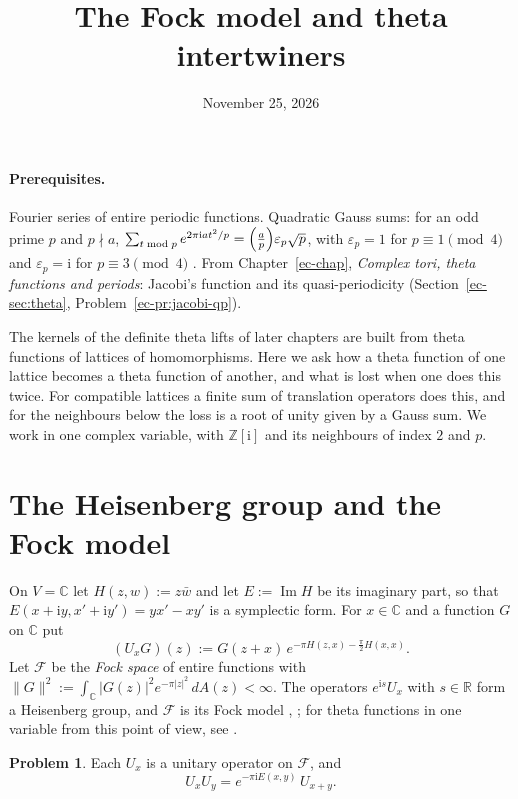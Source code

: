 \documentclass[reqno]{amsart}
\title{The Fock model and theta intertwiners}
\author{}
\date{November 25, 2026}
\newcounter{chap}
\theoremstyle{definition}
\newtheorem{problem}{Problem}[section]
\theoremstyle{plain}
\newcommand{\Z}{\mathbb{Z}}
\newcommand{\R}{\mathbb{R}}
\newcommand{\C}{\mathbb{C}}
\newcommand{\ii}{\mathrm{i}}
\newcommand{\Fc}{\mathcal{F}}
\newcommand{\leg}[2]{\Bigl(\frac{#1}{#2}\Bigr)}
\begin{document}
\maketitle
{}\label{chap}

\paragraph{Prerequisites.}
Fourier series of entire periodic functions.  Quadratic Gauss sums: for an odd prime \(p\) and \(p \nmid a\), \(\sum_{t \bmod p} e^{2\pi\ii a t^2/p} = \leg{a}{p}\varepsilon_p\sqrt p\), with \(\varepsilon_p = 1\) for \(p \equiv 1 \pmod 4\) and \(\varepsilon_p = \ii\) for \(p \equiv 3 \pmod 4\) \cite[Ch.~2]{Dav}.  From Chapter~\ref{ec-chap}, \emph{Complex tori, theta functions and periods}: Jacobi's function and its quasi-periodicity (Section~\ref{ec-sec:theta}, Problem~\ref{ec-pr:jacobi-qp}).

The kernels of the definite theta lifts of later chapters are built from theta functions of lattices of homomorphisms.  Here we ask how a theta function of one lattice becomes a theta function of another, and what is lost when one does this twice.  For compatible lattices a finite sum of translation operators does this, and for the neighbours below the loss is a root of unity given by a Gauss sum.  We work in one complex variable, with \(\Z[\ii]\) and its neighbours of index \(2\) and \(p\).

\section{The Heisenberg group and the Fock model}\label{sec:fock}

On \(V = \C\) let \(H(z,w) := z\bar w\) and let \(E := \operatorname{Im} H\) be its imaginary part, so that \(E(x + \ii y, x' + \ii y') = y x' - x y'\) is a symplectic form.  For \(x \in \C\) and a function \(G\) on \(\C\) put
\[
  (U_x G)(z) := G(z + x)\, e^{-\pi H(z,x) - \frac\pi2 H(x,x)} .
\]
Let \(\Fc\) be the \emph{Fock space} of entire functions with \(\lVert G\rVert^2 := \int_\C \lvert G(z)\rvert^2 e^{-\pi\lvert z\rvert^2}\, dA(z) < \infty\).  The operators \(e^{\ii s}U_x\) with \(s \in \R\) form a Heisenberg group, and \(\Fc\) is its Fock model \cite[Ch.~1]{Fo}, \cite[Ch.~2]{Pol}; for theta functions in one variable from this point of view, see \cite[Ch.~I, \S3]{Mu}.

\begin{problem}\label{pr:unitary}
Each \(U_x\) is a unitary operator on \(\Fc\), and
\[
  U_x U_y = e^{-\pi\ii E(x,y)}\, U_{x+y} .
\]
\end{problem}
\end{document}
